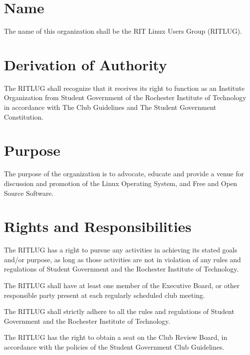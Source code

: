 



\section{Name}
The name of this organization shall be the RIT Linux Users Group (RITLUG).

\section{Derivation of Authority}
The RITLUG shall recognize that it receives its right to function as an Institute Organization from Student Government of the Rochester Institute of Technology in accordance with The Club Guidelines and The Student Government Constitution.

\section{Purpose}
The purpose of the organization is to advocate, educate and provide a venue for discussion and promotion of the Linux Operating System, and Free and Open Source Software.

\section{Rights and Responsibilities}
\begin{subroutines}
\item The RITLUG has a right to pursue any activities in achieving its stated goals and/or purpose, as long as those activities are not in violation of any rules and regulations of Student Government and the Rochester Institute of Technology.
\item The RITLUG shall have at least one member of the Executive Board, or other responsible party present at each regularly scheduled club meeting.
\item The RITLUG shall strictly adhere to all the rules and regulations of Student Government and the Rochester Institute of Technology.
\item The RITLUG has the right to obtain a seat on the Club Review Board, in accordance with the policies of the Student Government Club Guidelines.
\end{subroutines}

